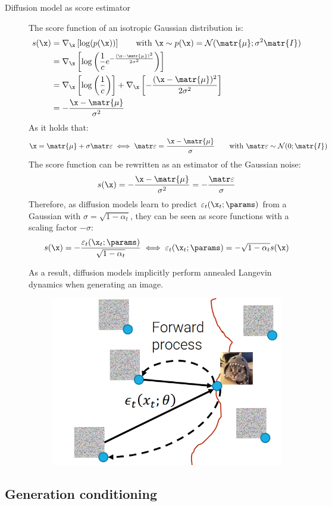 \begin{description}
    \item[Diffusion model as score estimator]
        The score function of an isotropic Gaussian distribution is:
        \[ 
            \begin{split}
                s(\x) &= \nabla_\x\left[ \log(p(\x)) \right] \qquad \text{with } \x \sim p(\x) = \mathcal{N}(\matr{\mu}; \sigma^2\matr{I}) \\
                &= \nabla_\x\left[ \log\left( \frac{1}{c} e^{-\frac{(\x-\matr{\mu})^2}{2\sigma^2}} \right) \right] \\
                &= \nabla_\x\left[ \log\left(\frac{1}{c}\right) \right] + \nabla_\x\left[ -\frac{(\x - \matr{\mu})^2}{2\sigma^2} \right] \\
                &= -\frac{\x - \matr{\mu}}{\sigma^2}
            \end{split}
        \]
        As it holds that:
        \[ \x = \matr{\mu} + \sigma\noise \iff \noise = \frac{\x - \matr{\mu}}{\sigma} \qquad \text{with } \noise \sim \mathcal{N}(0; \matr{I}) \]
        The score function can be rewritten as an estimator of the Gaussian noise:
        \[ s(\x) = -\frac{\x - \matr{\mu}}{\sigma^2} = -\frac{\noise}{\sigma} \]
        Therefore, as diffusion models learn to predict $\varepsilon_t(\x_t; \params)$ from a Gaussian with $\sigma = \sqrt{1-\alpha_t}$, they can be seen as score functions with a scaling factor $-\sigma$:
        \[ 
            s(\x) = -\frac{\varepsilon_t(\x_t; \params)}{\sqrt{1-\alpha_t}} \iff 
            \varepsilon_t(\x_t; \params) = -\sqrt{1-\alpha_t} s(\x)
        \]

        As a result, diffusion models implicitly perform annealed Langevin dynamics when generating an image.

        \begin{figure}[H]
            \centering
            \includegraphics[width=0.3\linewidth]{./img/diffusion_model_annealing.png}
        \end{figure}
\end{description}


\subsection{Generation conditioning}

